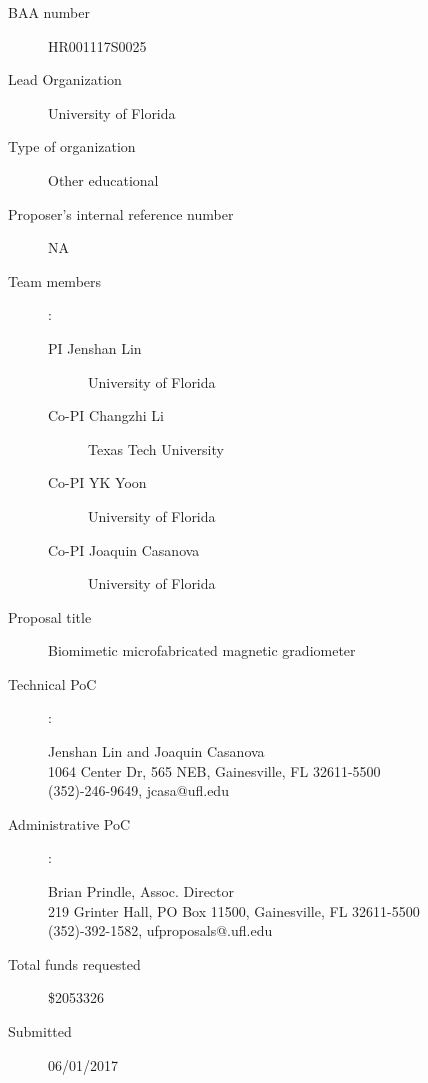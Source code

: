 \begin{description}
\item [BAA number] HR001117S0025
\item [Lead Organization] University of Florida
\item [Type of organization] Other educational
\item [Proposer’s internal reference number] NA
\item [Team members]:
  \begin{description}
  \item [PI Jenshan Lin] University of Florida 
  \item [Co-PI Changzhi Li] Texas Tech University
  \item [Co-PI YK Yoon] University of Florida 
  \item [Co-PI Joaquin Casanova] University of Florida 
  \end{description}
\item [Proposal title] Biomimetic microfabricated magnetic gradiometer
\item [Technical PoC]:
  \begin{description}
  \item [Jenshan Lin and Joaquin Casanova]
  \item [1064 Center Dr, 565 NEB, Gainesville, FL 32611-5500]
  \item [(352)-246-9649, jcasa@ufl.edu]
  \end{description}
\item [Administrative PoC]:
  \begin{description}
  \item [Brian Prindle, Assoc. Director]
  \item [219 Grinter Hall, PO Box 11500, Gainesville, FL 32611-5500]
  \item [(352)-392-1582, ufproposals@.ufl.edu]
  \end{description}
\item [Total funds requested] \$2053326
\item [Submitted] 06/01/2017
\end{description}
